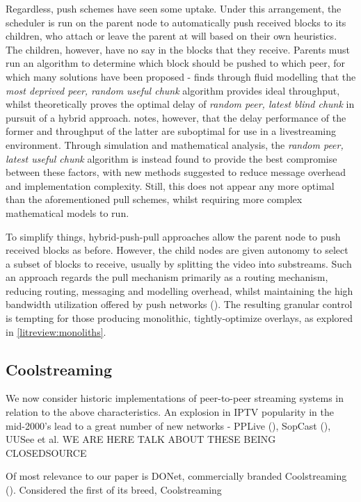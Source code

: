 \documentclass[12pt,a4paper]{article}
\begin{document}
Regardless, push schemes have seen some uptake. Under this arrangement, the scheduler is run on the parent node to automatically push received blocks to its children, who attach or leave the parent at will based on their own heuristics. The children, however, have no say in the blocks that they receive. Parents must run an algorithm to determine which block should be pushed to which peer, for which many solutions have been proposed - \cite{Massoulie2007} finds through fluid modelling that the \textit{most deprived peer, random useful chunk} algorithm provides ideal throughput, whilst \cite{Sanghavi2006} theoretically proves the optimal delay of \textit{random peer, latest blind chunk} in pursuit of a hybrid approach. \cite{Bonald2008} notes, however, that the delay performance of the former and throughput of the latter are suboptimal for use in a livestreaming environment. Through simulation and mathematical analysis, the \textit{random peer, latest useful chunk} algorithm is instead found to provide the best compromise between these factors, with new methods suggested to reduce message overhead and implementation complexity. Still, this does not appear any more optimal than the aforementioned pull schemes, whilst requiring more complex mathematical models to run.

To simplify things, hybrid-push-pull approaches allow the parent node to push received blocks as before. However, the child nodes are given autonomy to select a subset of blocks to receive, usually by splitting the video into substreams. Such an approach regards the pull mechanism primarily as a routing mechanism, reducing routing, messaging and modelling overhead, whilst maintaining the high bandwidth utilization offered by push networks (\cite{Zhang2007}). The resulting granular control is tempting for those producing monolithic, tightly-optimize overlays, as explored in \ref{litreview:monoliths}.

\subsection{Coolstreaming} \label{litreview:coolstreaming}
We now consider historic implementations of peer-to-peer streaming systems in relation to the above characteristics. An explosion in IPTV popularity in the mid-2000's lead to a great number of new networks - PPLive (\cite{PPLive}), SopCast (\cite{SopCast2019}), UUSee et al. WE ARE HERE TALK ABOUT THESE BEING CLOSEDSOURCE 

Of most relevance to our paper is DONet, commercially branded Coolstreaming (\cite{1498486}). Considered the first of its breed, Coolstreaming \cite{Xie2007} \cite{asdasd} \cite{1498486}
\end{document}
